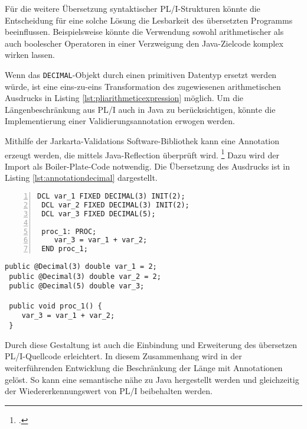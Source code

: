 Für die weitere Übersetzung syntaktischer PL/I-Strukturen könnte die Entscheidung für eine solche Lösung die Lesbarkeit des übersetzten Programms beeinflussen. Beispielsweise könnte die Verwendung sowohl arithmetischer als auch boolescher Operatoren in einer Verzweigung den Java-Zielcode komplex wirken lassen. 

Wenn das \verb+DECIMAL+-Objekt durch einen primitiven Datentyp ersetzt werden würde, ist eine eins-zu-eins Transformation des zugewiesenen arithmetischen Ausdrucks in Listing \ref{lst:pliarithmeticexpression} möglich. Um die Längenbeschränkung aus PL/I auch in Java zu berücksichtigen, könnte die Implementierung einer Validierungsannotation erwogen werden.

Mithilfe der Jarkarta-Validations Software-Bibliothek kann eine Annotation erzeugt werden, die mittels Java-Reflection überprüft wird. \footcite[Vgl. ][]{jakarta}
Dazu wird der Import als Boiler-Plate-Code  notwendig. 
Die Übersetzung des Ausdrucks ist in Listing \ref{lst:annotationdecimal} dargestellt.

\begin{minipage}[b]{0.48\linewidth}
	\centering
	\lstset{language=PL/I,label=SliceExaple}
	\begin{lstlisting}[frame=single, numbers=left, mathescape,%
		caption={Transformation DECIMAL}, label={lst:annotationdecimal},
		basicstyle=\fontsize{9}{13}\selectfont\ttfamily]
 DCL var_1 FIXED DECIMAL(3) INIT(2);
 DCL var_2 FIXED DECIMAL(3) INIT(2);
 DCL var_3 FIXED DECIMAL(5);
		
 proc_1: PROC;
	var_3 = var_1 + var_2;
 END proc_1;
	\end{lstlisting}
\end{minipage}
\hspace{0.5cm}
\begin{minipage}[b]{0.48\linewidth}
	\centering
	\lstset{language=Java,label=SliceExaple}
	\begin{lstlisting}[frame=single, mathescape,%
		title={" "},
		basicstyle=\fontsize{9}{13}\selectfont\ttfamily]
 public @Decimal(3) double var_1 = 2;
 public @Decimal(3) double var_2 = 2;
 public @Decimal(5) double var_3;
		
 public void proc_1() {
	var_3 = var_1 + var_2;
 }
	\end{lstlisting}
\end{minipage}

Durch diese Gestaltung ist auch die Einbindung und Erweiterung des übersetzen PL/I-Quellcode erleichtert. In diesem Zusammenhang wird in der weiterführenden Entwicklung die Beschränkung der Länge mit Annotationen gelöst. So kann eine semantische nähe zu Java hergestellt werden und gleichzeitig der Wiedererkennungswert von PL/I beibehalten werden.

